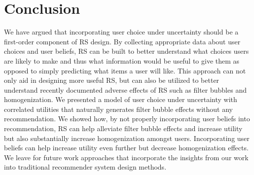 \documentclass[sigconf]{acmart}
\begin{document}
\section{Conclusion}

We have argued that incorporating user choice under uncertainty should be a first-order component of RS design. By collecting appropriate data about user choices and user beliefs, RS can be built to better understand what choices users are likely to make and thus what information would be useful to give them as opposed to simply predicting what items a user will like. This approach can not only aid in designing more useful RS, but can also be utilized to better understand recently documented adverse effects of RS such as filter bubbles and homogenization. We presented a model of user choice under uncertainty with correlated utilities that naturally generates filter bubble effects without any recommendation. We showed how, by not properly incorporating user beliefs into recommendation, RS can help alleviate filter bubble effects and increase utility but also substantially increase homogenization amongst users. Incorporating user beliefs can help increase utility even further but decrease homogenization effects. We leave for future work approaches that incorporate the insights from our work into traditional recommender system design methods.



\end{document}
